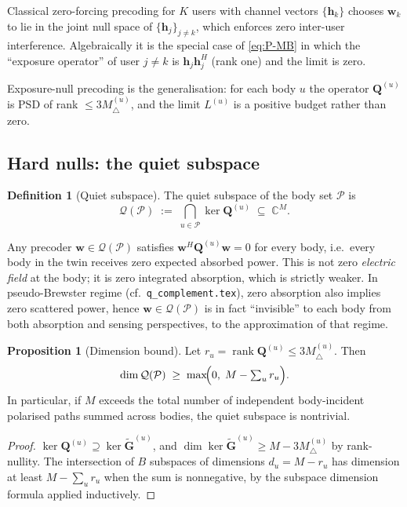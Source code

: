 \documentclass[11pt,a4paper]{article}
\theoremstyle{definition}
\newtheorem{proposition}[proposition]{Proposition}
\newtheorem{definition}[definition]{Definition}
\newcommand{\ww}{\mathbf{w}}
\newcommand{\hh}{\mathbf{h}}
\newcommand{\Q}{\mathbf{Q}}
\newcommand{\Gtil}{\tilde{\mathbf{G}}}
\DeclareMathOperator{\rank}{rank}
\newcommand{\Complex}{\mathbb{C}}
\newcommand{\Bodies}{\mathcal{P}}
\begin{document}
Classical zero-forcing precoding for $K$ users with channel vectors
$\{\hh_k\}$ chooses $\ww_k$ to lie in the joint null space of
$\{\hh_j\}_{j\ne k}$, which enforces zero inter-user interference.
Algebraically it is the special case of \eqref{eq:P-MB} in which the
``exposure operator'' of user $j\ne k$ is $\hh_j\hh_j^H$ (rank one)
and the limit is zero.

Exposure-null precoding is the generalisation: for each body $u$ the
operator $\Q^{(u)}$ is PSD of rank $\le 3M_\triangle^{(u)}$, and the
limit $L^{(u)}$ is a positive budget rather than zero.

\subsection{Hard nulls: the quiet subspace}

\begin{definition}[Quiet subspace]\label{def:quiet}
The quiet subspace of the body set $\Bodies$ is
\[
  \mathcal{Q}(\Bodies)\;:=\;\bigcap_{u\in\Bodies}\ker\Q^{(u)}
  \;\subseteq\;\Complex^M.
\]
\end{definition}

Any precoder $\ww\in\mathcal{Q}(\Bodies)$ satisfies
$\ww^H\Q^{(u)}\ww=0$ for every body, i.e.\ every body in the twin
receives zero expected absorbed power. This is not zero
\emph{electric field} at the body; it is zero integrated
absorption, which is strictly weaker. In pseudo-Brewster regime
(cf.~\texttt{q\_complement.tex}), zero absorption also implies zero
scattered power, hence $\ww\in\mathcal{Q}(\Bodies)$ is in fact
``invisible'' to each body from both absorption and sensing
perspectives, to the approximation of that regime.

\begin{proposition}[Dimension bound]\label{prop:dim}
Let $r_u=\rank\Q^{(u)}\le 3M_\triangle^{(u)}$. Then
\[
  \dim\mathcal{Q}(\Bodies)\;\ge\;\max\!\Bigl(0,\;
     M-\textstyle\sum_u r_u\Bigr).
\]
In particular, if $M$ exceeds the total number of independent
body-incident polarised paths summed across bodies, the quiet
subspace is nontrivial.
\end{proposition}

\begin{proof}
$\ker\Q^{(u)}\supseteq\ker\Gtil^{(u)}$, and
$\dim\ker\Gtil^{(u)}\ge M-3M_\triangle^{(u)}$ by rank-nullity.
The intersection of $B$ subspaces of dimensions $d_u=M-r_u$ has
dimension at least $M-\sum_u r_u$ when the sum is nonnegative, by
the subspace dimension formula applied inductively.
\end{proof}
\end{document}
